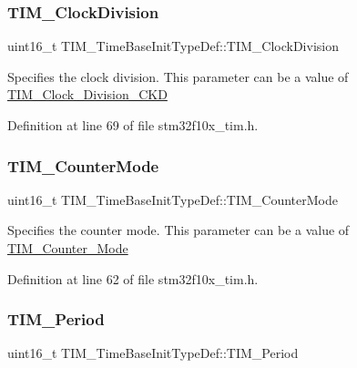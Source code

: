 \subsubsection{\texorpdfstring{T\+I\+M\+\_\+\+Clock\+Division}{TIM\_ClockDivision}}
{\footnotesize\ttfamily uint16\+\_\+t T\+I\+M\+\_\+\+Time\+Base\+Init\+Type\+Def\+::\+T\+I\+M\+\_\+\+Clock\+Division}

Specifies the clock division. This parameter can be a value of \hyperlink{group___t_i_m___clock___division___c_k_d}{T\+I\+M\+\_\+\+Clock\+\_\+\+Division\+\_\+\+C\+KD} 

Definition at line 69 of file stm32f10x\+\_\+tim.\+h.

\mbox{\label{struct_t_i_m___time_base_init_type_def_a0de4138cd939566bc667f21df089e195}} 
\subsubsection{\texorpdfstring{T\+I\+M\+\_\+\+Counter\+Mode}{TIM\_CounterMode}}
{\footnotesize\ttfamily uint16\+\_\+t T\+I\+M\+\_\+\+Time\+Base\+Init\+Type\+Def\+::\+T\+I\+M\+\_\+\+Counter\+Mode}

Specifies the counter mode. This parameter can be a value of \hyperlink{group___t_i_m___counter___mode}{T\+I\+M\+\_\+\+Counter\+\_\+\+Mode} 

Definition at line 62 of file stm32f10x\+\_\+tim.\+h.

\mbox{\label{struct_t_i_m___time_base_init_type_def_aeb5b90dc8f8a1ab85584e732789b2ee4}} 
\subsubsection{\texorpdfstring{T\+I\+M\+\_\+\+Period}{TIM\_Period}}
{\footnotesize\ttfamily uint16\+\_\+t T\+I\+M\+\_\+\+Time\+Base\+Init\+Type\+Def\+::\+T\+I\+M\+\_\+\+Period}

